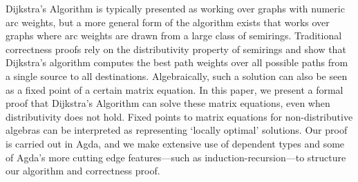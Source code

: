 Dijkstra's Algorithm is typically presented as working over graphs with numeric arc weights, but a more general form of the algorithm exists that works over graphs where arc weights are drawn from a large class of semirings.
Traditional correctness proofs rely on the distributivity property of semirings and show that Dijkstra's algorithm computes the best path weights over all possible paths from a single source to all destinations.
Algebraically, such a solution can also be seen as a fixed point of a certain matrix equation.
In this paper, we present a formal proof that Dijkstra's Algorithm can solve these matrix equations, even when distributivity does not hold.
Fixed points to matrix equations for non-distributive algebras can be interpreted as representing `locally optimal' solutions.
Our proof is carried out in Agda, and we make extensive use of dependent types and some of Agda's more cutting edge features---such as induction-recursion---to structure our algorithm and correctness proof.

